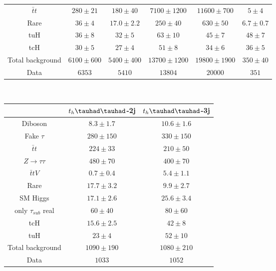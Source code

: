 \begin{table}[htbp]
\begin{tabular}{cccccc}
  $\bar{t}t$               & $280 \pm 21   $& $180 \pm 40   $& $7100 \pm 1200  $& $11600 \pm 700      $& $5 \pm 4      $ \\ 
  Rare                     & $36 \pm 4     $& $17.0 \pm 2.2 $& $250 \pm 40     $& $630 \pm 50         $& $6.7 \pm 0.7  $ \\ \midrule
  tuH                      & $36 \pm 8     $& $32 \pm 5     $& $63 \pm 10      $& $45 \pm 7           $& $48 \pm 7     $ \\ 
  tcH                      & $30 \pm 5     $& $27 \pm 4     $& $51 \pm 8       $& $34 \pm 6           $& $36 \pm 5     $ \\ \midrule
  Total background         & $6100 \pm 600 $& $5400 \pm 400 $& $13700 \pm 1200 $& $19800 \pm 1900     $& $350 \pm 40   $ \\ \midrule
  Data                     & $6353         $& $5410         $& $13804          $& $20000              $& $351          $ \\ 
\bottomrule\bottomrule
\end{tabular}\\

\begin{tabular}{ccc} \toprule\toprule
& $t_{h}\thadhad$-2j & $t_{h}\thadhad$-3j\\\midrule
  Diboson                  & $8.3 \pm 1.7  $& $10.6 \pm 1.6$\\ 
  Fake $\tau$              & $280 \pm 150  $& $330 \pm 150 $\\ 
  $\bar{t}t$                & $224 \pm 33   $& $210 \pm 50  $\\ 
  $Z\rightarrow\tau\tau$   & $480 \pm 70   $& $400 \pm 70  $\\ 
  $\bar{t}tV$              & $0.7 \pm 0.4  $& $5.4 \pm 1.1 $\\ 
  Rare                     & $17.7 \pm 3.2 $& $9.9 \pm 2.7 $\\ 
  SM Higgs                 & $17.1 \pm 2.6 $& $25.6 \pm 3.4$\\ 
  only $\tau_{sub}$ real   & $60 \pm 40    $& $80 \pm 60   $\\ \midrule
  tcH                      & $15.6 \pm 2.5 $& $42 \pm 8    $\\ 
  tuH                      & $23 \pm 4     $& $52 \pm 10   $ \\ \midrule
  Total background         & $1090 \pm 190 $& $1080 \pm 210$ \\ \midrule 
  Data                     & $1033$         & $1052$ \\ 
\bottomrule\bottomrule
\end{tabular}
\label{tab:HtautauPrefitYieldsUnblind}
\end{table} 




